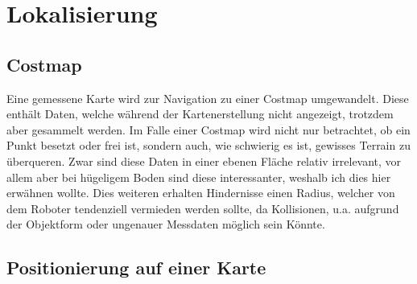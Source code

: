\section{Lokalisierung}
{
	\subsection{Costmap}
	{
		Eine gemessene Karte wird zur Navigation zu einer Costmap umgewandelt. Diese enthält Daten, welche während  der Kartenerstellung nicht angezeigt, trotzdem aber gesammelt werden. Im Falle einer Costmap wird nicht nur betrachtet, ob ein Punkt besetzt oder frei ist, sondern auch, wie schwierig es ist, gewisses Terrain zu überqueren. Zwar sind diese Daten in einer ebenen Fläche relativ irrelevant, vor allem aber bei hügeligem Boden sind diese interessanter, weshalb ich dies hier erwähnen wollte. Dies weiteren erhalten Hindernisse einen Radius, welcher von dem Roboter tendenziell vermieden werden sollte, da Kollisionen, u.a. aufgrund der Objektform oder ungenauer Messdaten möglich sein Könnte.
	}
	
	\subsection{Positionierung auf einer Karte}
	{
		
}}

